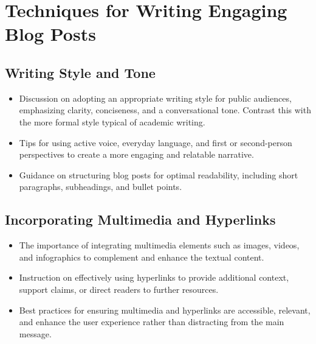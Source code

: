 \documentclass[
]{book}
\begin{document}
\hypertarget{techniques-for-writing-engaging-blog-posts}{%
\section*{Techniques for Writing Engaging Blog Posts}\label{techniques-for-writing-engaging-blog-posts}}

\hypertarget{writing-style-and-tone}{%
\subsection*{Writing Style and Tone}\label{writing-style-and-tone}}

\begin{itemize}
\item
  Discussion on adopting an appropriate writing style for public audiences, emphasizing clarity, conciseness, and a conversational tone. Contrast this with the more formal style typical of academic writing.
\item
  Tips for using active voice, everyday language, and first or second-person perspectives to create a more engaging and relatable narrative.
\item
  Guidance on structuring blog posts for optimal readability, including short paragraphs, subheadings, and bullet points.
\end{itemize}

\hypertarget{incorporating-multimedia-and-hyperlinks}{%
\subsection*{Incorporating Multimedia and Hyperlinks}\label{incorporating-multimedia-and-hyperlinks}}

\begin{itemize}
\item
  The importance of integrating multimedia elements such as images, videos, and infographics to complement and enhance the textual content.
\item
  Instruction on effectively using hyperlinks to provide additional context, support claims, or direct readers to further resources.
\item
  Best practices for ensuring multimedia and hyperlinks are accessible, relevant, and enhance the user experience rather than distracting from the main message.
\end{itemize}
\end{document}
